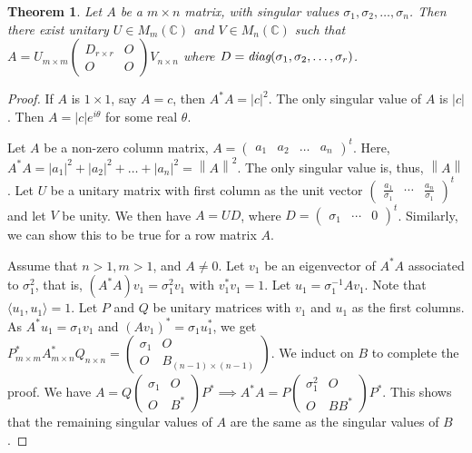 \documentclass[15pt,a4paper]{book}
\newtheorem{theorem}{Theorem}[chapter]
\theoremstyle{definition}
\newcommand{\abs}[1]{\left| #1 \right|} %
\newcommand{\C}{\mathbb{C}}
\newcommand{\ip}[1]{\langle #1 \rangle}
\newcommand{\norm}[1]{\left\lVert#1\right\rVert}
\begin{document}
\begin{theorem}
    Let $A$ be a $m \times n$ matrix, with singular values $\sigma_{1},\sigma_{2},\ldots,\sigma_{n}$. Then there exist unitary $U \in M_{m}(\C)$ and $V \in M_{n}(\C)$ such that $A = U_{m \times m} \begin{pmatrix}
        D_{r \times r} & O \\ O & O
    \end{pmatrix} V_{n \times n}$ where $D = \emph{\text{diag}}(\sigma_{1},\sigma_{2},\ldots,\sigma_{r})$.
\end{theorem}
\begin{proof}
    If $A$ is $1 \times 1$, say $A = c$, then $A^{\ast}A = \abs{c}^{2}$. The only singular value of $A$ is $\abs{c}$. Then $A = \abs{c}e^{i\theta}$ for some real $\theta$.

    Let $A$ be a non-zero column matrix, $A = \begin{pmatrix}
        a_{1} & a_{2} & \ldots & a_{n}
    \end{pmatrix}^{t}$. Here, $A^{\ast}A = \abs{a_{1}}^{2} + \abs{a_{2}}^{2} + \ldots + \abs{a_{n}}^{2} = \norm{A}^{2}$. The only singular value is, thus, $\norm{A}$. Let $U$ be a unitary matrix with first column as the unit vector $\begin{pmatrix}
        \frac{a_{1}}{\sigma_{1}} & \cdots & \frac{a_{n}}{\sigma_{1}}
    \end{pmatrix}^{t}$ and let $V$ be unity. We then have $A = UD$, where $D = \begin{pmatrix}
        \sigma_{1} & \cdots & 0
    \end{pmatrix}^{t}$. Similarly, we can show this to be true for a row matrix $A$.

    Assume that $n >1, m>1$, and $A \neq 0$. Let $v_{1}$ be an eigenvector of $A^{\ast}A$ associated to $\sigma_{1}^{2}$, that is, $(A^{\ast}A)v_{1} = \sigma_{1}^{2}v_{1}$ with $v_{1}^{\ast}v_{1} = 1$. Let $u_{1} = \sigma_{1}^{-1}Av_{1}$. Note that $\ip{u_{1},u_{1}} = 1$. Let $P$ and $Q$ be unitary matrices with $v_{1}$ and $u_{1}$ as the first columns. As $A^{\ast}u_{1} = \sigma_{1}v_{1}$ and $(Av_{1})^{\ast} = \sigma_{1}u_{1}^{\ast}$, we get $P_{m \times m}^{\ast} A_{m \times n}^{\ast} Q_{n \times n} = \begin{pmatrix}
        \sigma_{1} & O \\ O & B_{(n-1) \times (n-1)}
    \end{pmatrix}$. We induct on $B$ to complete the proof. We have $A = Q \begin{pmatrix}
        \sigma_{1} & O \\ O & B^{\ast}
    \end{pmatrix} P^{\ast} \implies A^{\ast}A = P \begin{pmatrix}
        \sigma_{1}^{2} & O \\ O & BB^{\ast}
    \end{pmatrix} P^{\ast}$. This shows that the remaining singular values of $A$ are the same as the singular values of $B$.
\end{proof}
\end{document}
